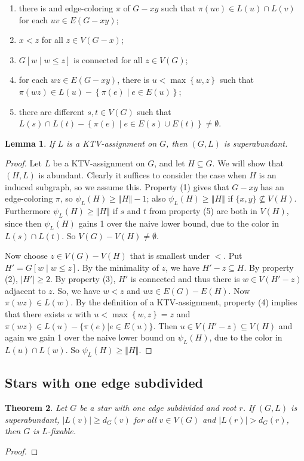 \documentclass[12pt]{article}
\theoremstyle{plain}
\newtheorem{thm}{Theorem}[section]
\newtheorem{lem}[thm]{Lemma}
\theoremstyle{definition}
\theoremstyle{remark}
\newcommand{\set}[1]{\left\{ #1 \right\}}
\newcommand{\setbs}[2]{\left\{ #1 \mid #2 \right\}}
\newcommand{\card}[1]{\left|#1\right|}
\newcommand{\size}[1]{\left\Vert#1\right\Vert}
\newcommand{\brackets}[1]{\left[ #1 \right]}
\begin{document}
\begin{enumerate}
\item there is and edge-coloring $\pi$ of $G-xy$ such that $\pi(uv) \in L(u) \cap L(v)$ for each $uv \in E(G - xy)$; 
\item $x < z$ for all $z \in V(G - x)$; 
\item $G\brackets{w \mid w \le z}$ is connected for all $z \in V(G)$; 
\item for each $wz \in E(G - xy)$, there is $u < \max\set{w, z}$ such that $\pi(wz) \in L(u) - \setbs{\pi(e)}{e \in E(u)}$;
\item there are different $s, t \in V(G)$ such that $L(s) \cap L(t) - \setbs{\pi(e)}{e \in E(s) \cup E(t)} \ne \emptyset$.
\end{enumerate}

\begin{lem}\label{KTVImpliesSuperabundant}
If $L$ is a KTV-assignment on $G$, then $(G, L)$ is superabundant.
\end{lem}
\begin{proof}
Let $L$ be a KTV-assignment on $G$, and let $H \subseteq G$.  We will show that
$(H,L)$ is abundant.  
Clearly it suffices to consider the case when $H$ is an induced subgraph, so we
assume this.
Property (1) gives that $G-xy$ has an edge-coloring
$\pi$, so $\psi_L(H)\ge \size{H}-1$; also $\psi_L(H)\ge \size{H}$ if
$\{x,y\}\not\subseteq V(H)$.  Furthermore $\psi_L(H)\ge \size{H}$ if $s$ and
$t$ from property (5) are both in $V(H)$, since then $\psi_L(H)$ gains 1 over
the naive lower bound, due to the color in $L(s)\cap L(t)$.  So $V(G)-
V(H)\ne \emptyset$.

Now choose $z \in V(G) - V(H)$ that is smallest under $<$.  
Put $H' = G\brackets{w \mid w \le z}$.  By the minimality of $z$, we have $H' - z \subseteq H$. By property (2), $\card{H'} \ge 2$.  
By property (3), $H'$ is connected and thus there is $w \in V(H' - z)$ adjacent to $z$. So, we have $w < z$ and $wz\in E(G)-E(H)$.
Now $\pi(wz)\in L(w)$.  By the definition of a KTV-assignment, 
property (4) implies that there exists $u$ with $u < \max\set{w, z} = z$ and $\pi(wz) \in
L(u)-\{\pi(e)|e\in E(u)\}$.  Then $u \in V(H' - z) \subseteq V(H)$ and
again we gain 1 over the naive lower bound on $\psi_L(H)$, due to the color
in $L(u)\cap L(w)$.  So $\psi_L(H)\ge \size{H}$.
\end{proof}

\subsection{Stars with one edge subdivided}
\begin{thm}
Let $G$ be a star with one edge subdivided and root $r$. If $(G, L)$ is superabundant, $|L(v)| \ge d_G(v)$ for all $v \in V(G)$ and $|L(r)| > d_G(r)$, then $G$ is $L$-fixable.
\end{thm}
\begin{proof}

\end{proof}
\end{document}
